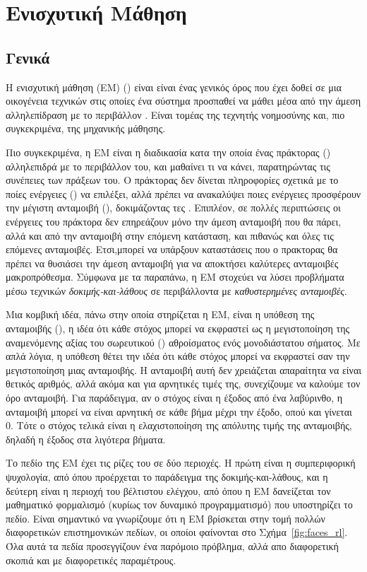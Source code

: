 \chapter{Ενισχυτική Μάθηση}

\section{Γενικά}
Η ενισχυτική μάθηση (ΕΜ) () είναι είναι ένας γενικός όρος που έχει
δοθεί σε μια οικογένεια τεχνικών στις οποίες ένα σύστημα προσπαθεί να μάθει μέσα από την άμεση αλληλεπίδραση
με το περιβάλλον \cite{aigreek}. Είναι τομέας της τεχνητής νοημοσύνης και, πιο συγκεκριμένα, της μηχανικής μάθησης.

Πιο συγκεκριμένα, η ΕΜ είναι η διαδικασία κατα την οποία ένας πράκτορας () αλληλεπιδρά με το περιβάλλον του,
και μαθαίνει τι να κάνει, παρατηρώντας τις συνέπειες των πράξεων του.
Ο πράκτορας δεν δίνεται πληροφορίες σχετικά με το ποίες ενέργειες () να επιλέξει, αλλά πρέπει να
ανακαλύψει ποιες ενέργειες προσφέρουν την μέγιστη ανταμοιβή (), δοκιμάζοντας τες \cite{rlbook}.
Επιπλέον, σε πολλές περιπτώσεις οι ενέργειες του πράκτορα δεν επηρεάζουν μόνο την άμεση ανταμοιβή που θα πάρει,
αλλά και από την ανταμοιβή στην επόμενη κατάσταση, και πιθανώς και όλες τις επόμενες ανταμοιβές. Ετσι,μπορεί να υπάρξουν
καταστάσεις που ο πρακτορας θα πρέπει να θυσιάσει την άμεση ανταμοιβή για να αποκτήσει καλύτερες ανταμοιβές μακροπρόθεσμα.
Σύμφωνα με τα παραπάνω, η ΕΜ στοχεύει να λύσει προβλήματα μέσω τεχνικών
\textit{δοκιμής-και-λάθους } σε περιβάλλοντα με \textit{καθυστερημένες ανταμοιβές}.

Μια κομβική ιδέα, πάνω στην οποία στηρίζεται η ΕΜ, είναι η υπόθεση της ανταμοιβής (), η ιδέα ότι κάθε στόχος
μπορεί να εκφραστεί ως η μεγιστοποίηση της αναμενόμενης αξίας του σωρευτικού () αθροίσματος ενός μονοδιάστατου
σήματος. Με απλά λόγια, η υπόθεση θέτει την ιδέα ότι κάθε στόχος μπορεί να εκφραστεί σαν την μεγιστοποίηση μιας ανταμοιβής.
Η ανταμοιβή αυτή δεν χρειάζεται απαραίτητα να είναι θετικός αριθμός, αλλά ακόμα και για αρνητικές τιμές της, συνεχίζουμε να καλούμε
τον όρο ανταμοιβή. Για παράδειγμα, αν ο στόχος είναι η έξοδος από ένα λαβύρινθο, η ανταμοιβή μπορεί να είναι αρνητική σε κάθε βήμα
μέχρι την έξοδο, οπού και γίνεται 0. Τότε ο στόχος τελικά είναι η ελαχιστοποίηση της απόλυτης τιμής της ανταμοιβής, δηλαδή η έξοδος
στα λιγότερα βήματα.

Το πεδίο της ΕΜ έχει τις ρίζες του σε δύο περιοχές. Η πρώτη είναι η συμπεριφορική ψυχολογία, από όπου προέρχεται το
παράδειγμα της δοκιμής-και-λάθους, και η δεύτερη είναι η περιοχή του βέλτιστου ελέγχου, από όπου η ΕΜ δανείζεται
τον μαθηματικό φορμαλισμό (κυρίως τον δυναμικό προγραμματισμό) που υποστηρίζει το πεδίο. Είναι σημαντικό να γνωρίζουμε ότι η ΕΜ
βρίσκεται στην τομή πολλών διαφορετικών επιστημονικών πεδίων, οι οποίοι φαίνονται στο Σχήμα~\ref{fig:faces_rl}\cite{silver2015}.
Όλα αυτά τα πεδία προσεγγίζουν ένα παρόμοιο πρόβλημα, αλλά απο διαφορετική σκοπιά και με διαφορετικές παραμέτρους.

